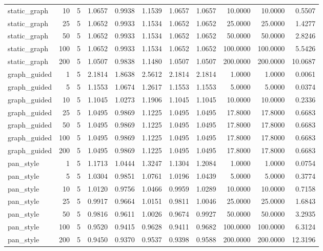 \begin{table}[t]
\begin{tabular}{lrrrrrrrrrr}
static\_graph & 10 & 5 & 1.0657 & 0.9938 & 1.1539 & 1.0657 & 1.0657 & 10.0000 & 10.0000 & 0.5507 \\
static\_graph & 25 & 5 & 1.0652 & 0.9933 & 1.1534 & 1.0652 & 1.0652 & 25.0000 & 25.0000 & 1.4277 \\
static\_graph & 50 & 5 & 1.0652 & 0.9933 & 1.1534 & 1.0652 & 1.0652 & 50.0000 & 50.0000 & 2.8246 \\
static\_graph & 100 & 5 & 1.0652 & 0.9933 & 1.1534 & 1.0652 & 1.0652 & 100.0000 & 100.0000 & 5.5426 \\
static\_graph & 200 & 5 & 1.0507 & 0.9838 & 1.1480 & 1.0507 & 1.0507 & 200.0000 & 200.0000 & 10.0687 \\
graph\_guided & 1 & 5 & 2.1814 & 1.8638 & 2.5612 & 2.1814 & 2.1814 & 1.0000 & 1.0000 & 0.0061 \\
graph\_guided & 5 & 5 & 1.1553 & 1.0674 & 1.2617 & 1.1553 & 1.1553 & 5.0000 & 5.0000 & 0.0374 \\
graph\_guided & 10 & 5 & 1.1045 & 1.0273 & 1.1906 & 1.1045 & 1.1045 & 10.0000 & 10.0000 & 0.2336 \\
graph\_guided & 25 & 5 & 1.0495 & 0.9869 & 1.1225 & 1.0495 & 1.0495 & 17.8000 & 17.8000 & 0.6683 \\
graph\_guided & 50 & 5 & 1.0495 & 0.9869 & 1.1225 & 1.0495 & 1.0495 & 17.8000 & 17.8000 & 0.6683 \\
graph\_guided & 100 & 5 & 1.0495 & 0.9869 & 1.1225 & 1.0495 & 1.0495 & 17.8000 & 17.8000 & 0.6683 \\
graph\_guided & 200 & 5 & 1.0495 & 0.9869 & 1.1225 & 1.0495 & 1.0495 & 17.8000 & 17.8000 & 0.6683 \\
pan\_style & 1 & 5 & 1.1713 & 1.0444 & 1.3247 & 1.1304 & 1.2084 & 1.0000 & 1.0000 & 0.0754 \\
pan\_style & 5 & 5 & 1.0304 & 0.9851 & 1.0761 & 1.0196 & 1.0439 & 5.0000 & 5.0000 & 0.3774 \\
pan\_style & 10 & 5 & 1.0120 & 0.9756 & 1.0466 & 0.9959 & 1.0289 & 10.0000 & 10.0000 & 0.7158 \\
pan\_style & 25 & 5 & 0.9917 & 0.9664 & 1.0151 & 0.9811 & 1.0046 & 25.0000 & 25.0000 & 1.6843 \\
pan\_style & 50 & 5 & 0.9816 & 0.9611 & 1.0026 & 0.9674 & 0.9927 & 50.0000 & 50.0000 & 3.2935 \\
pan\_style & 100 & 5 & 0.9520 & 0.9415 & 0.9628 & 0.9411 & 0.9682 & 100.0000 & 100.0000 & 6.3124 \\
pan\_style & 200 & 5 & 0.9450 & 0.9370 & 0.9537 & 0.9398 & 0.9588 & 200.0000 & 200.0000 & 12.3196 \\

\end{tabular}
\end{table}
